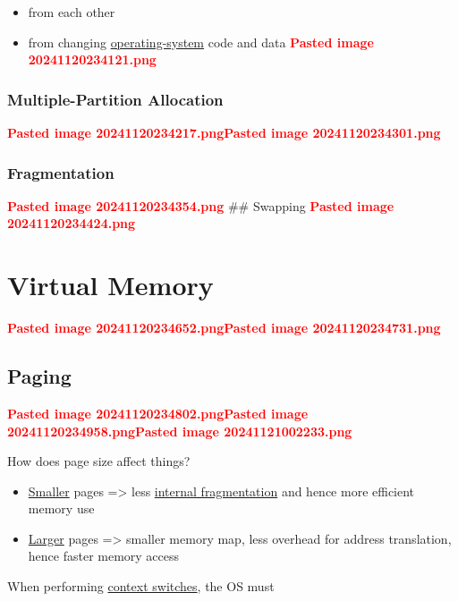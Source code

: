\begin{itemize}
\tightlist
\item
  from each other
\item
  from changing \ul{operating-system} code and data
  \textcolor{red}{\textbf{Pasted image 20241120234121.png}}
\end{itemize}

\subsubsection*{Multiple-Partition Allocation}

\textcolor{red}{\textbf{Pasted image 20241120234217.png}}\textcolor{red}{\textbf{Pasted image 20241120234301.png}}

\subsubsection*{Fragmentation}

\textcolor{red}{\textbf{Pasted image 20241120234354.png}} \#\# Swapping
\textcolor{red}{\textbf{Pasted image 20241120234424.png}}

\section*{Virtual Memory}

\textcolor{red}{\textbf{Pasted image 20241120234652.png}}\textcolor{red}{\textbf{Pasted image 20241120234731.png}}

\subsection*{Paging}

\textcolor{red}{\textbf{Pasted image 20241120234802.png}}\textcolor{red}{\textbf{Pasted image 20241120234958.png}}\textcolor{red}{\textbf{Pasted image 20241121002233.png}}

How does page size affect things?

\begin{itemize}
\tightlist
\item
  \ul{Smaller} pages =\textgreater{} less \ul{internal fragmentation}
  and hence more efficient memory use
\item
  \ul{Larger} pages =\textgreater{} smaller memory map, less overhead
  for address translation, hence faster memory access
\end{itemize}

When performing \ul{context switches}, the OS must

